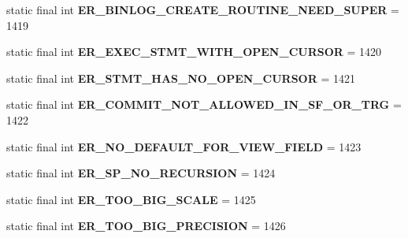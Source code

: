 \begin{DoxyCompactItemize}
static final int {\bfseries E\+R\+\_\+\+B\+I\+N\+L\+O\+G\+\_\+\+C\+R\+E\+A\+T\+E\+\_\+\+R\+O\+U\+T\+I\+N\+E\+\_\+\+N\+E\+E\+D\+\_\+\+S\+U\+P\+ER} = 1419
\item 
\mbox{\label{classcom_1_1mysql_1_1jdbc_1_1_mysql_error_numbers_a31f7832873330b858ae14960ae176d0e}} 
static final int {\bfseries E\+R\+\_\+\+E\+X\+E\+C\+\_\+\+S\+T\+M\+T\+\_\+\+W\+I\+T\+H\+\_\+\+O\+P\+E\+N\+\_\+\+C\+U\+R\+S\+OR} = 1420
\item 
\mbox{\label{classcom_1_1mysql_1_1jdbc_1_1_mysql_error_numbers_ad34ef54c3445ebd85de21455f2c5f73c}} 
static final int {\bfseries E\+R\+\_\+\+S\+T\+M\+T\+\_\+\+H\+A\+S\+\_\+\+N\+O\+\_\+\+O\+P\+E\+N\+\_\+\+C\+U\+R\+S\+OR} = 1421
\item 
\mbox{\label{classcom_1_1mysql_1_1jdbc_1_1_mysql_error_numbers_a62b71bc4e47c260831756d59186943c2}} 
static final int {\bfseries E\+R\+\_\+\+C\+O\+M\+M\+I\+T\+\_\+\+N\+O\+T\+\_\+\+A\+L\+L\+O\+W\+E\+D\+\_\+\+I\+N\+\_\+\+S\+F\+\_\+\+O\+R\+\_\+\+T\+RG} = 1422
\item 
\mbox{\label{classcom_1_1mysql_1_1jdbc_1_1_mysql_error_numbers_aa926bf08f9fd3db70f0c87317be16e5f}} 
static final int {\bfseries E\+R\+\_\+\+N\+O\+\_\+\+D\+E\+F\+A\+U\+L\+T\+\_\+\+F\+O\+R\+\_\+\+V\+I\+E\+W\+\_\+\+F\+I\+E\+LD} = 1423
\item 
\mbox{\label{classcom_1_1mysql_1_1jdbc_1_1_mysql_error_numbers_a8f40926715b073a38387fe7c4626ded3}} 
static final int {\bfseries E\+R\+\_\+\+S\+P\+\_\+\+N\+O\+\_\+\+R\+E\+C\+U\+R\+S\+I\+ON} = 1424
\item 
\mbox{\label{classcom_1_1mysql_1_1jdbc_1_1_mysql_error_numbers_a28260a0d7c6ade21eb850466b349ca8d}} 
static final int {\bfseries E\+R\+\_\+\+T\+O\+O\+\_\+\+B\+I\+G\+\_\+\+S\+C\+A\+LE} = 1425
\item 
\mbox{\label{classcom_1_1mysql_1_1jdbc_1_1_mysql_error_numbers_af7527dfdd3c5ed8550606771e88ec762}} 
static final int {\bfseries E\+R\+\_\+\+T\+O\+O\+\_\+\+B\+I\+G\+\_\+\+P\+R\+E\+C\+I\+S\+I\+ON} = 1426

\end{DoxyCompactItemize}
